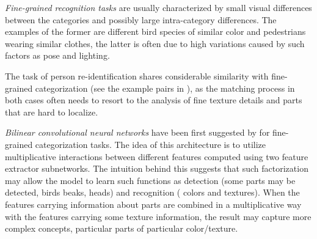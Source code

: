 
\textit{Fine-grained recognition tasks} are usually characterized by small visual differences between the categories and possibly large intra-category differences. The examples of the former are different bird species of similar color and pedestrians wearing similar clothes, the latter is often due to high variations caused by such factors as pose and lighting. 

The task of person re-identification shares considerable similarity with fine-grained categorization (see the example pairs in ), as the matching process in both cases often needs to resort to the analysis of fine texture details and parts that are hard to localize. 

\textit{Bilinear convolutional neural networks} have been first suggested by \citep{lin2015bilinear} for fine-grained categorization tasks. The idea of this architecture is to utilize multiplicative interactions between different features computed using two feature extractor subnetworks. The intuition behind this suggests that such factorization may allow the model to learn such functions as detection (some parts may be detected, \eg{} birds beaks, heads) and recognition (\eg{} colors and textures). When the features carrying information about parts are combined in a  multiplicative way with the features carrying some texture information, the result may capture more complex concepts, \eg{} particular parts of particular color/texture.

